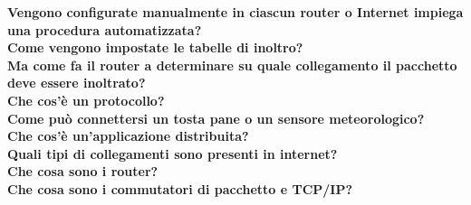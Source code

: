 \documentclass[11pt, oneside]{article}   	%
\begin{document}
\textbf{Vengono configurate manualmente in ciascun router o Internet impiega una procedura automatizzata?}\\

\textbf{Come vengono impostate le tabelle di inoltro?}\\

\textbf{Ma come fa il router a determinare su quale collegamento il pacchetto deve essere inoltrato?}\\

\textbf{Che cos'è un protocollo?}\\

\textbf{Come può connettersi un tosta pane o un sensore meteorologico?}\\

\textbf{Che cos'è un'applicazione distribuita?}\\

\textbf{Quali tipi di collegamenti sono presenti in internet?}\\

\textbf{Che cosa sono i router?}\\

\textbf{Che cosa sono i commutatori di pacchetto e TCP/IP?}\\
\end{document}
